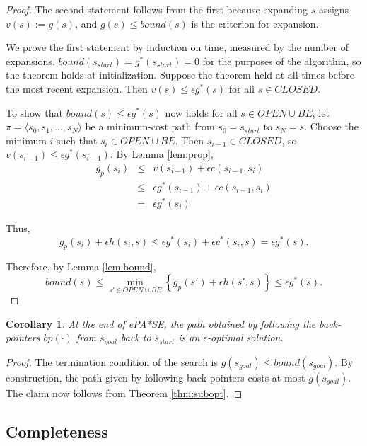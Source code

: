 \documentclass[letterpaper]{article}
\newtheorem{cor}{Corollary}
\begin{document}
\begin{proof}
The second statement follows from the first because expanding $s$ assigns $v(s) := g(s)$, and $g(s) \le bound(s)$ is the criterion for expansion.

We prove the first statement by induction on time, measured by the number of expansions. $bound(s_{start}) = g^*(s_{start}) = 0$ for the purposes of the algorithm, so the theorem holds at initialization. Suppose the theorem held at all times before the most recent expansion. Then $v(s) \le \epsilon g^*(s)$ for all $s\in CLOSED$.

To show that $bound(s) \le \epsilon g^*(s)$ now holds for all $s\in OPEN\cup BE$, let $\pi = \langle s_0,s_1,\ldots,s_N \rangle$ be a minimum-cost path from $s_0 = s_{start}$ to $s_N = s$. Choose the minimum $i$ such that $s_i\in OPEN\cup BE$. Then $s_{i-1}\in CLOSED$, so $v(s_{i-1}) \le \epsilon g^*(s_{i-1})$. By Lemma \ref{lem:prop},
\begin{eqnarray*}
g_p(s_i) &\le& v(s_{i-1}) + \epsilon c(s_{i-1},s_i)
\\&\le& \epsilon g^*(s_{i-1}) + \epsilon c(s_{i-1},s_i)
\\&=& \epsilon g^*(s_i)
\end{eqnarray*}

Thus,
\[g_p(s_i) + \epsilon h(s_i,s) \le \epsilon g^*(s_i) + \epsilon c^*(s_i,s) = \epsilon g^*(s).\]

Therefore, by Lemma \ref{lem:bound},
\[bound(s) \le \min_{s' \in OPEN \cup BE} \left\{g_p(s') + \epsilon h(s',s)\right\} \le \epsilon g^*(s).\]
\end{proof}

\begin{cor}
\label{cor:subopt}
At the end of ePA*SE, the path obtained by following the back-pointers $bp(\cdot)$ from $s_{goal}$ back to $s_{start}$ is an $\epsilon$-optimal solution.
\end{cor}

\begin{proof}
The termination condition of the search is $g(s_{goal}) \le bound(s_{goal})$. By construction, the path given by following back-pointers costs at most $g(s_{goal})$. The claim now follows from Theorem \ref{thm:subopt}.
\end{proof}

\subsection{Completeness}
\end{document}
